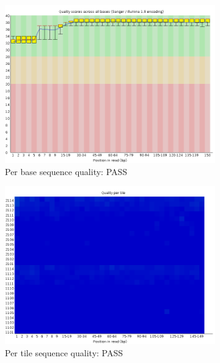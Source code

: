 \documentclass{article}
\begin{document}
\begin{figure}[htbp]
\centering
\begin{subfigure}{0.45\linewidth}
\includegraphics[width=\linewidth]{04-R1.qfilter_fastqc/Images/per_base_quality.png}
\caption{Per base sequence quality: PASS}
\end{subfigure}
\begin{subfigure}{0.45\linewidth}
\includegraphics[width=\linewidth]{04-R1.qfilter_fastqc/Images/per_tile_quality.png}
\caption{Per tile sequence quality: PASS}
\end{subfigure}
\begin{subfigure}{0.45\linewidth}

\end{subfigure}
\end{figure}
\end{document}

